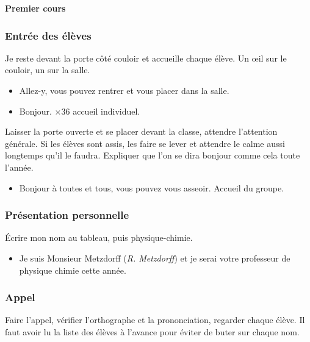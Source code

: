 




\begin{header}
\begin{center}
\LARGE
\textbf{Premier cours}
\end{center}
\end{header}

\subsubsection*{Entrée des élèves}
Je reste devant la porte côté couloir et accueille chaque élève. Un œil sur le couloir, un sur la salle.
\begin{itemize}
\item \og Allez-y, vous pouvez rentrer et vous placer dans la salle. \fg{} 
\item \og Bonjour. \fg{} $\times 36$ accueil individuel.
\end{itemize}
Laisser la porte ouverte et se placer devant la classe, attendre l'attention générale.
Si les élèves sont assis, les faire se lever et attendre le calme aussi longtemps qu'il le faudra.
Expliquer que l'on se dira bonjour comme cela toute l'année.
\begin{itemize}
\item \og Bonjour à toutes et tous, vous pouvez vous asseoir. \fg{} Accueil du groupe.
\end{itemize}

\subsubsection*{Présentation personnelle}
Écrire mon nom au tableau, puis physique-chimie.
\begin{itemize}
\item \og Je suis Monsieur Metzdorff (\textit{R. Metzdorff}) et je serai votre professeur de physique chimie cette année. \fg{}
\end{itemize}

\subsubsection*{Appel}
Faire l'appel, vérifier l'orthographe et la prononciation, regarder chaque élève. Il faut avoir lu la liste des élèves à l'avance pour éviter de buter sur chaque nom.

